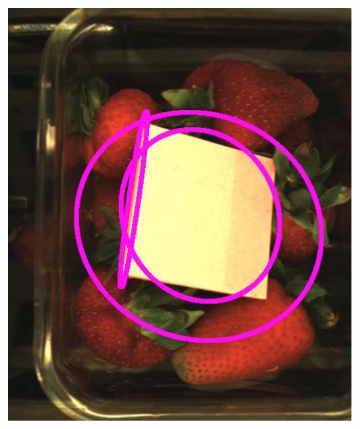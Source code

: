 \documentclass[fleqn,twoside,12pt]{report}
\begin{document}
\begin{figure}[h]
\begin{subfigure}{.25\textwidth}
		\caption{}
		\label{fig:fo_2}
	\end{subfigure}%
	\begin{subfigure}{.25\textwidth}
		\centering
		\includegraphics[width=.9\linewidth]{fo_3.jpg}
		\caption{}
		\label{fig:fo_3}
	\end{subfigure}%


\end{figure}
\end{document}
